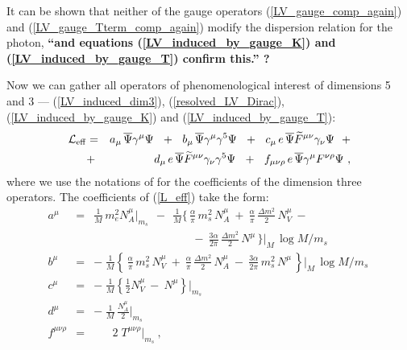 \documentclass[12pt]{revtex4}
\begin{document}
It can be shown 
\cite{GrootNibbelink:2004za}
that neither of the gauge operators 
(\ref{LV_gauge_comp_again}) and
(\ref{LV_gauge_Tterm_comp_again}) 
modify the dispersion relation for the photon,
{\bf ``and equations (\ref{LV_induced_by_gauge_K})
  and (\ref{LV_induced_by_gauge_T}) confirm this.'' ?}

Now we can gather all operators of phenomenological
interest of dimensions 5 and 3 --- 
(\ref{LV_induced_dim3}), (\ref{resolved_LV_Dirac}),
(\ref{LV_induced_by_gauge_K}) and
(\ref{LV_induced_by_gauge_T}):
\begin{eqnarray}
\label{L_eff}
  \mathcal{L}_{\rm eff}
        & = &
        a_\mu\, \overline{\Psi} \gamma^\mu \Psi
~~+~~
b_\mu\, \overline{\Psi} \gamma^\mu \gamma^5 \Psi
~~+~~
c_\mu\, e\, \overline{\Psi} \widetilde{F}^{\mu\nu}
                    \gamma_\nu \Psi
        ~~+\\
\nonumber
& + &
d_\mu\, e\, \overline{\Psi} \widetilde{F}^{\mu\nu}
                    \gamma_\nu \gamma^5 \Psi
        ~~+~~
        f_{\mu\nu\rho}\, 
     e\, \overline{\Psi} \gamma^\mu F^{\nu\rho} \Psi
~,
\end{eqnarray}
where we use the notations of 
\cite{Colladay:1998fq}
for the coefficients of the 
dimension three operators.
The coefficients of (\ref{L_eff}) take the form:
\begin{eqnarray}
\nonumber
        a^\mu & = &
	 \frac{1}{M}\, m_e^2 N_A^\mu \Bigr|_{m_s}
	~~-~~
	\frac{1}{M}
	\Biggl\{\,
        	\frac{\alpha}{\pi}\, m_s^2\, N_A^\mu 
		~+~
		\frac{\alpha}{\pi}\, \frac{\Delta m^2}{2}\, 
                                             N_V^\mu
		~-~\\
\nonumber
        &&
\qquad\qquad\qquad\qquad~\;
		~-~
		\frac{3\alpha}{2\pi}\, \frac{\Delta m^2}{2}\, 
                                               N^\mu
       		\,
	\Biggr\}\Biggr|_M\, \log M/m_s~
\\
\nonumber
	b^\mu & = & 
	-\;
	\frac{1}{M}
	\left\{\,
        	\frac{\alpha}{\pi}\, m_s^2\, N_V^\mu
		~+~
		\frac{\alpha}{\pi}\, \frac{\Delta m^2}{2}\, 
                                             N_A^\mu
		~-~
		\frac{3\alpha}{2\pi}\, m_s^2\, N^\mu
       		\,
	\right\}\Biggr|_M\, \log M/m_s~
\\
\label{L_eff_coefs}
	c^\mu & = &
	-\;
	\frac{1}{M}
	\left\{ 
       		\frac{1}{2}N_V^\mu
       		~-~
       		N^\mu
	\right\} \Biggr|_{m_s}
\\
\nonumber
	d^\mu & = &
	-\;
	\frac{1}{M}\, \frac{N_A^\mu}{2} \Biggr|_{m_s}
\\
\nonumber
	f^{\mu\nu\rho} & = &
	\phantom{~-~}
	2\; T^{\mu\nu\rho}
	\Biggr|_{m_s}
~,
\end{eqnarray}
\end{document}
